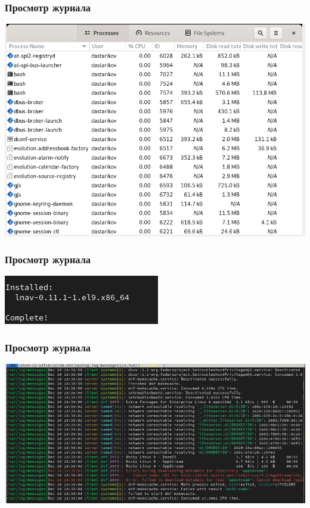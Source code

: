 \begin{frame}
\frametitle{Просмотр журнала}
    \centering
    \includegraphics[width=\textwidth]{../images/image09.png}
\end{frame}


\begin{frame}
\frametitle{Просмотр журнала}
    \centering
    \includegraphics[width=\textwidth]{../images/image10.png}
\end{frame}


\begin{frame}
\frametitle{Просмотр журнала}
    \centering
    \includegraphics[width=\textwidth]{../images/image11.png}
\end{frame}


